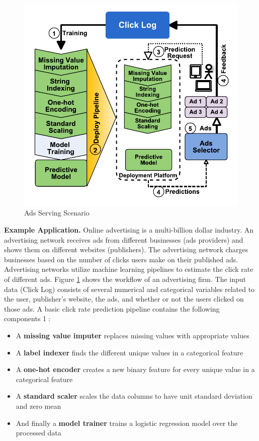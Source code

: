 \begin{figure}[t]
\centering
\includegraphics[width=\columnwidth]{../images/motivational-example-vertical-small.pdf}
\caption{Ads Serving Scenario}
\label{fig:motivational-example}
\end{figure}
\textbf{Example Application.} 
Online advertising is a multi-billion dollar industry.
An advertising network receives ads from different businesses (ads providers) and shows them on different websites (publishers).
The advertising network charges businesses based on the number of clicks users make on their published ads.
Advertising networks utilize machine learning pipelines to estimate the click rate of different ads.
Figure \ref{fig:motivational-example} shows the workflow of an advertising firm.
The input data (Click Log) consists of several numerical and categorical variables related to the user, publisher's website,  the ads,  and whether or not the users clicked on those ads.
A basic click rate prediction pipeline contains the following components \textcircled{1}:
\begin{itemize}
\item A \textbf{missing value imputer} replaces missing values with appropriate values
\item A \textbf{label indexer} finds the different unique values in a categorical feature 
\item A \textbf{one-hot encoder} creates a new binary feature for every unique value in a categorical feature
\item A \textbf{standard scaler} scales the data columns to have unit standard deviation and zero mean
\item And finally a \textbf{model trainer} trains a logistic regression model over the processed data
\end{itemize}
